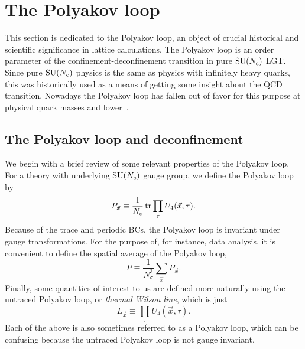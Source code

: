 \section{The Polyakov loop}\label{sec:ploop}

This section is dedicated to the Polyakov loop, an object of crucial
historical and scientific significance in lattice calculations. The
Polyakov loop is an order parameter of the confinement-deconfinement
transition in pure $\operatorname{SU}(N_c)$ LGT. Since pure $\operatorname{SU}(N_c)$ physics is the 
same as physics with infinitely heavy quarks, this was historically used
as a means of getting some insight about the QCD transition. Nowadays
the Polyakov loop has fallen out of favor for this purpose at physical
quark masses and lower~\cite{clarke_polyakov_2020}.

\subsection{The Polyakov loop and deconfinement}
We begin with a brief review of some relevant properties of the
Polyakov loop. For a theory with underlying $\operatorname{SU}(N_c)$ gauge group, we define
the Polyakov loop by
\begin{equation}\label{eq:ploop}
  P_{\vec{x}}\equiv\frac{1}{N_c}\tr\prod_\tau U_4(\vec{x},\tau).
\end{equation}
Because of the trace and periodic BCs, the Polyakov loop is invariant under
gauge transformations. For the purpose of, for instance, data analysis, it
is convenient to define the spatial average of the Polyakov loop,
\begin{equation}\label{eq:ploopav}
  P\equiv\frac{1}{N_\sigma^3}\sum_{\vec{x}}P_{\vec{x}}.
\end{equation}
Finally, some quantities of interest to us are defined more
naturally using the untraced Polyakov loop, or {\it thermal Wilson line}, 
 which is just
\begin{equation}\label{eq:untracedPolyakov}
  L_{\vec{x}}\equiv\prod_\tau U_4(\vec{x},\tau).
\end{equation}
Each of the above is also sometimes referred to as a Polyakov
loop, which can be confusing because the untraced Polyakov loop is not
gauge invariant.

